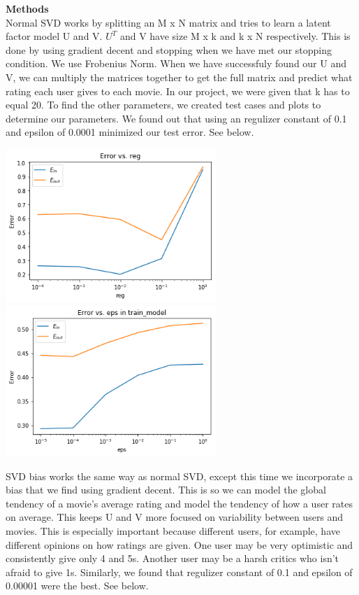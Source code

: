 \noindent\textbf{Methods }\\
Normal SVD works by splitting an M x N matrix and tries to learn a latent factor model U and V. $U^T$ and V have size M x k and k x N respectively. This is done by using gradient decent and stopping when we have met our stopping condition. We use Frobenius Norm. When we have successfuly found our U and V, we can multiply the matrices together to get the full matrix and predict what rating each user gives to each movie. In our project, we were given that k has to equal 20. To find the other parameters, we created test cases and plots to determine our parameters. We found out that using an regulizer constant of 0.1 and epsilon of 0.0001 minimized our test error. See below. 
\begin{center}
	\includegraphics[width=8cm]{Pictures/1_reg}\includegraphics[width=8cm]{Pictures/1_eps}
\end{center}
SVD bias works the same way as normal SVD, except this time we incorporate a bias that we find using gradient decent. This is so we can model the global tendency of a movie's average rating and model the tendency of how a user rates on average. This keeps U and V more focused on variability between users and movies. This is especially important because different users, for example, have different opinions on how ratings are given. One user may be very optimistic and consistently give only 4 and 5s. Another user may be a harsh critics who isn't afraid to give 1s. Similarly, we found that regulizer constant of 0.1 and epsilon of 0.00001 were the best. See below. 
